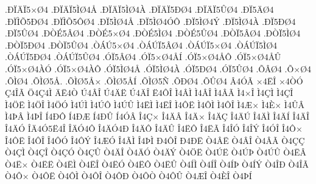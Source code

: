 {.^^d0^^cf^^c4^^cf5^^d7^^d84
.^^d0^^cf^^c4^^cf5^^cc^^d84^^c5
.^^d0^^cf^^c4^^cf5^^cc^^d84^^c0
.^^d0^^cf^^c4^^cf5^^d0^^d84
.^^d0^^cf^^c4^^cf5^^db^^d84
.^^d0^^cf5^^c4^^d84
.^^d0^^cf^^cc^^d55^^d0^^d84
.^^d0^^cf^^cc^^d55^^d4^^d84
.^^d0^^cf5^^cc^^d84^^c5
.^^d0^^cf5^^cc^^d84^^d3^^d4
.^^d0^^cf5^^cc^^d84^^dd
.^^d0^^cf5^^cc^^d84^^c0
.^^d0^^cf5^^d0^^d84
.^^d0^^cf5^^db^^d84
.^^d0^^d2^^c95^^c2^^d84
.^^d0^^d2^^c95^^d7^^d84
.^^d0^^d2^^c95^^cc^^d84
.^^d0^^d2^^c95^^db^^d84
.^^d0^^d2^^cf5^^c2^^d84
.^^d0^^d2^^cf5^^cc^^d84
.^^d0^^d2^^cf5^^d0^^d84
.^^d0^^d2^^cf5^^db^^d84
.^^d2^^c1^^da5^^d7^^d84
.^^d2^^c1^^da^^cf5^^c2^^d84
.^^d2^^c1^^da^^cf5^^d7^^d84
.^^d2^^c1^^da^^cf5^^cc^^d84
.^^d2^^c1^^da^^cf5^^d0^^d84
.^^d2^^c1^^da^^cf5^^db^^d84
.^^d3^^cf5^^c2^^d84
.^^d3^^cf5^^d7^^d84^^c5^^cd
.^^d3^^cf5^^d7^^d84^^c5^^d4
.^^d3^^cf5^^d7^^d84^^c5^^db
.^^d3^^cf5^^d7^^d84^^c0^^d3
.^^d3^^cf5^^d7^^d84^^c0^^d4
.^^d3^^cf5^^cc^^d84^^c5
.^^d3^^cf5^^cc^^d84^^c0
.^^d3^^cf5^^d0^^d84
.^^d3^^cf5^^db^^d84
.^^d5^^c2^^d84
.^^d5^^d7^^d84
.^^d5^^cc^^d84
.^^d5^^cc^^d85^^c5.
.^^d5^^cc^^d85^^c5^^d7
.^^d5^^cc^^d85^^c5^^cd
.^^d5^^cc^^d85^^d1
.^^d5^^d0^^d84
.^^d5^^db^^d84
^^c24^^d3^^c3
^^d74^^cb^^ce
^^d74^^d2^^d3
^^c74^^ce^^c3
^^d64^^c74^^cc
^^c4^^cb4^^d2
^^da4^^c2^^ce
^^da4^^c4^^cb
^^da4^^c4^^ce
^^cb4^^d4^^ce
^^cc4^^c2^^cc
^^cc4^^c2^^ce
^^cc4^^c2^^c3
^^cc4^^d7^^ce
^^cc4^^c7^^cc
^^cc4^^c7^^ce
^^cc4^^d6^^cb
^^cc4^^d6^^ce
^^cc4^^d6^^d3
^^cc4^^da^^cc
^^cc4^^da^^d4
^^cc4^^da^^db
^^cc4^^cb^^cc
^^cc4^^cb^^ce
^^cc4^^d4^^cb
^^cc4^^d4^^cc
^^cc4^^d4^^ce
^^cc4^^c6^^d7
^^cc4^^c8^^d7
^^cc4^^db^^c2
^^cc4^^de^^c2
^^cc4^^de^^ce
^^cd4^^d0^^d4
^^cd4^^d0^^c6
^^cd4^^d0^^db
^^cd4^^d3^^c2
^^ce4^^c7^^d7
^^ce4^^c4^^c2
^^ce4^^c4^^d7
^^ce4^^c4^^c7
^^ce4^^c4^^da
^^ce4^^c4^^cc
^^ce4^^c4^^cd
^^ce4^^c4^^ce
^^ce4^^c4^^d3
^^ce^^c44^^d35^^cb4^^ce
^^ce^^c4^^d34^^d4
^^ce4^^c4^^d34^^d0
^^ce4^^c4^^d4
^^ce4^^c4^^db
^^ce4^^cb^^d4
^^ce4^^cb^^c3
^^ce4^^ce^^d3
^^ce4^^ce^^dd
^^ce4^^d3^^ce
^^ce4^^d4^^d7
^^ce4^^d4^^cb
^^ce4^^d4^^ce
^^ce4^^d4^^d3
^^ce4^^d4^^dd
^^ce4^^c6^^d3
^^ce4^^c3^^cc
^^ce4^^de^^cc
^^d04^^d4^^ce
^^d04^^d0^^cb
^^d24^^c2^^cb
^^d24^^c2^^ce
^^d24^^c2^^c3
^^d24^^c7^^c7
^^d24^^c7^^cc
^^d24^^c7^^ce
^^d24^^c7^^d3
^^d24^^c7^^db
^^d24^^c4^^ce
^^d24^^c4^^d3
^^d24^^c4^^dd
^^d24^^d6^^cb
^^d24^^da^^cb
^^d24^^da^^de
^^d24^^da^^db
^^d24^^cb^^c2
^^d24^^cb^^d7
^^d24^^cb^^cb
^^d24^^cb^^cc
^^d24^^cb^^ce
^^d24^^cb^^d3
^^d24^^cb^^d4
^^d24^^cb^^db
^^d24^^cd^^cc
^^d24^^cd^^ce
^^d24^^cd^^de
^^d24^^cd^^dd
^^d24^^ce^^d0
^^d24^^ce^^c3
^^d24^^d4^^d7
^^d24^^d4^^cb
^^d24^^d4^^cc
^^d24^^d4^^ce
^^d24^^d4^^d0
^^d24^^d4^^d2
^^d24^^d4^^db
^^d24^^c6^^ce
^^d24^^c8^^ce
^^d24^^de^^cd
}
